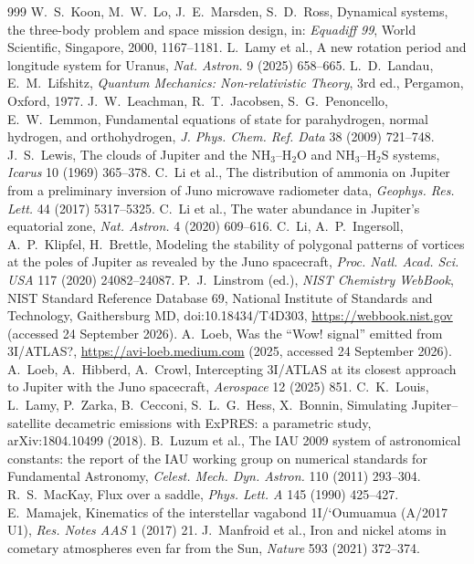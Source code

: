 \documentclass[11pt]{article}
\theoremstyle{definition}\newtheorem{definition}[theorem]{Definition}
\theoremstyle{remark}\newtheorem{remark}[theorem]{Remark}
\begin{document}
\begin{thebibliography}{999}
 W.~S.~Koon, M.~W.~Lo, J.~E.~Marsden, S.~D.~Ross, Dynamical systems, the three-body problem and space mission design, in: \emph{Equadiff 99}, World Scientific, Singapore, 2000, 1167--1181.
 L.~Lamy et al., A new rotation period and longitude system for Uranus, \emph{Nat. Astron.} 9 (2025) 658--665.
 L.~D.~Landau, E.~M.~Lifshitz, \emph{Quantum Mechanics: Non-relativistic Theory}, 3rd ed., Pergamon, Oxford, 1977.
 J.~W.~Leachman, R.~T.~Jacobsen, S.~G.~Penoncello, E.~W.~Lemmon, Fundamental equations of state for parahydrogen, normal hydrogen, and orthohydrogen, \emph{J. Phys. Chem. Ref. Data} 38 (2009) 721--748.
 J.~S.~Lewis, The clouds of Jupiter and the NH$_3$--H$_2$O and NH$_3$--H$_2$S systems, \emph{Icarus} 10 (1969) 365--378.
 C.~Li et al., The distribution of ammonia on Jupiter from a preliminary inversion of Juno microwave radiometer data, \emph{Geophys. Res. Lett.} 44 (2017) 5317--5325.
 C.~Li et al., The water abundance in Jupiter's equatorial zone, \emph{Nat. Astron.} 4 (2020) 609--616.
 C.~Li, A.~P.~Ingersoll, A.~P.~Klipfel, H.~Brettle, Modeling the stability of polygonal patterns of vortices at the poles of Jupiter as revealed by the Juno spacecraft, \emph{Proc. Natl. Acad. Sci. USA} 117 (2020) 24082--24087.
 P.~J.~Linstrom (ed.), \emph{NIST Chemistry WebBook}, NIST Standard Reference Database 69, National Institute of Standards and Technology, Gaithersburg MD, doi:10.18434/T4D303, \url{https://webbook.nist.gov} (accessed 24 September 2026).
 A.~Loeb, Was the ``Wow! signal'' emitted from 3I/ATLAS?, \url{https://avi-loeb.medium.com} (2025, accessed 24 September 2026).
 A.~Loeb, A.~Hibberd, A.~Crowl, Intercepting 3I/ATLAS at its closest approach to Jupiter with the Juno spacecraft, \emph{Aerospace} 12 (2025) 851.
 C.~K.~Louis, L.~Lamy, P.~Zarka, B.~Cecconi, S.~L.~G.~Hess, X.~Bonnin, Simulating Jupiter--satellite decametric emissions with ExPRES: a parametric study, arXiv:1804.10499 (2018).
 B.~Luzum et al., The IAU 2009 system of astronomical constants: the report of the IAU working group on numerical standards for Fundamental Astronomy, \emph{Celest. Mech. Dyn. Astron.} 110 (2011) 293--304.
 R.~S.~MacKay, Flux over a saddle, \emph{Phys. Lett. A} 145 (1990) 425--427.
 E.~Mamajek, Kinematics of the interstellar vagabond 1I/\textquoteleft Oumuamua (A/2017 U1), \emph{Res. Notes AAS} 1 (2017) 21.
 J.~Manfroid et al., Iron and nickel atoms in cometary atmospheres even far from the Sun, \emph{Nature} 593 (2021) 372--374.

\end{thebibliography}
\end{document}

